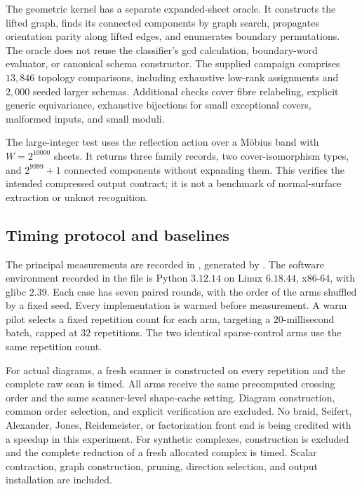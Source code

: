 The geometric kernel has a separate expanded-sheet oracle. It
constructs the lifted graph, finds its connected components by graph
search, propagates orientation parity along lifted edges, and
enumerates boundary permutations. The oracle does not reuse the
classifier's gcd calculation, boundary-word evaluator, or canonical
schema constructor. The supplied campaign comprises \(13{,}846\)
topology comparisons, including exhaustive low-rank assignments and
\(2{,}000\) seeded larger schemas. Additional checks cover fibre
relabeling, explicit generic equivariance, exhaustive bijections for
small exceptional covers, malformed inputs, and small moduli.

The large-integer test uses the reflection action over a M\"obius
band with \(W=2^{10000}\) sheets. It returns three family records,
two cover-isomorphism types, and \(2^{9999}+1\) connected components
without expanding them. This verifies the intended compressed output
contract; it is not a benchmark of normal-surface extraction or
unknot recognition.

\subsection{Timing protocol and baselines}
\label{sec:timing-protocol}

The principal measurements are recorded in
, generated by
. The software environment recorded
in the file is Python \(3.12.14\) on Linux \(6.18.44\), x86-64, with
glibc \(2.39\). Each case has seven paired rounds, with the order of
the arms shuffled by a fixed seed. Every implementation is warmed
before measurement. A warm pilot selects a fixed repetition count
for each arm, targeting a \(20\)-millisecond batch, capped at
\(32\) repetitions. The two identical sparse-control arms use the
same repetition count.

For actual diagrams, a fresh scanner is constructed on every
repetition and the complete raw scan is timed. All arms receive the
same precomputed crossing order and the same scanner-level
shape-cache setting. Diagram construction, common order selection,
and explicit verification are excluded. No braid, Seifert,
Alexander, Jones, Reidemeister, or factorization front end is being
credited with a speedup in this experiment. For synthetic complexes,
construction is excluded and the complete reduction of a fresh
allocated complex is timed. Scalar contraction, graph construction,
pruning, direction selection, and output installation are included.


